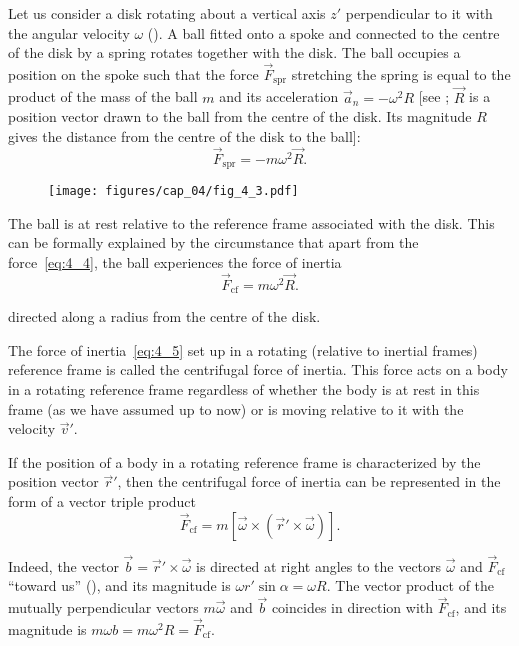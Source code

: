 Let us consider a disk rotating about a vertical axis $z'$ perpendicular to it with the angular velocity $\omega$ (). A ball fitted onto a spoke and connected to the centre of the disk by a spring rotates together with the disk. The ball occupies a position on the spoke such that the force $\vec{F}_{\text{spr}}$ stretching the spring is equal to the product of the mass of the ball $m$ and its acceleration $\vec{a}_n = -\omega^2R$ [see ; $\vec{R}$ is a position vector drawn to the ball from the centre of the disk. Its magnitude $R$ gives the distance from the centre of the disk to the ball]:
\begin{equation}\label{eq:4_4}
\vec{F}_{\text{spr}} = -m\omega^2\vec{R}.
\end{equation}

\begin{figure}[t]
	\begin{center}
		\texttt{[image: figures/cap\_04/fig\_4\_3.pdf]}
		\caption[]{}
		\label{fig:4_3}
	\end{center}
\end{figure}

The ball is at rest relative to the reference frame associated with the disk. This can be formally explained by the circumstance that apart from the force~\eqref{eq:4_4}, the ball experiences the force of inertia
\begin{equation}\label{eq:4_5}
\vec{F}_{\text{cf}} = m\omega^2\vec{R}.
\end{equation}

\noindent
directed along a radius from the centre of the disk.

The force of inertia~\eqref{eq:4_5} set up in a rotating (relative to inertial frames) reference frame is called the centrifugal force of inertia. This force acts on a body in a rotating reference frame regardless of whether the body is at rest in this frame (as we have assumed up to now) or is moving relative to it with the velocity $\vec{v}'$.

If the position of a body in a rotating reference frame is characterized by the position vector $\vec{r}'$, then the centrifugal force of inertia can be represented in the form of a vector triple product
\begin{equation}\label{eq:4_6}
\vec{F}_{\text{cf}} = m [\vec{\omega} \times (\vec{r}'\times\vec{\omega})].
\end{equation}

\noindent
Indeed, the vector $\vec{b}=\vec{r}'\times\vec{\omega}$ is directed at right angles to the vectors $\vec{\omega}$ and $\vec{F}_{\text{cf}}$ ``toward us'' (), and its magnitude is $\omega r'\sin\alpha=\omega R$. The vector product of the mutually perpendicular vectors $m\vec{\omega}$ and $\vec{b}$ coincides in direction with $\vec{F}_{\text{cf}}$, and its magnitude is $m\omega b=m\omega^2R=\vec{F}_{\text{cf}}$.

